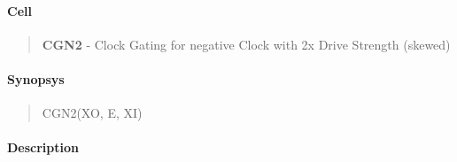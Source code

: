 \label{CGN2}
\paragraph{Cell}
\begin{quote}
    \textbf{CGN2} - Clock Gating for negative Clock with 2x Drive Strength (skewed)
\end{quote}

\paragraph{Synopsys}
\begin{quote}
    CGN2(XO, E, XI)
\end{quote}

\paragraph{Description}

%

%

